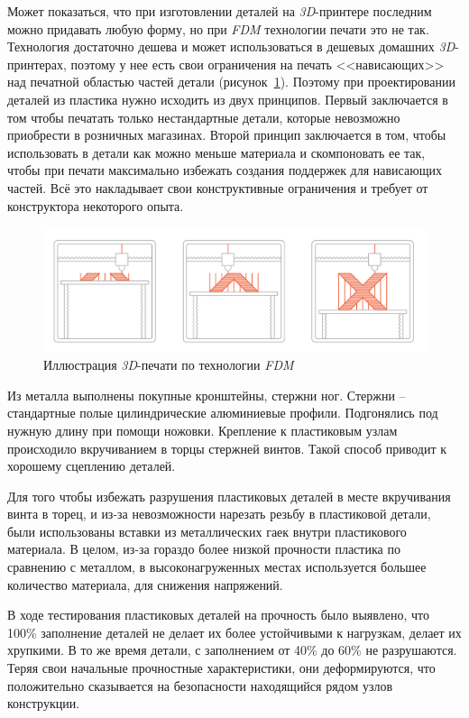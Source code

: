 Может показаться, что при изготовлении деталей на \textit{3D}-принтере последним можно придавать любую форму, но при \textit{FDM} технологии печати это не так. Технология достаточно дешева и может использоваться в дешевых домашних \textit{3D}-принтерах, поэтому у нее есть свои ограничения на печать <<нависающих>> над печатной областью частей детали (рисунок~\ref{fig:print_demo}). Поэтому при проектировании деталей из пластика нужно исходить из двух принципов. Первый заключается в том чтобы печатать только нестандартные детали, которые невозможно приобрести в розничных магазинах. Второй принцип заключается в том, чтобы использовать в детали как можно меньше материала и скомпоновать ее так, чтобы при печати максимально избежать создания поддержек для нависающих частей. Всё это накладывает свои конструктивные ограничения и требует от конструктора некоторого опыта.

\begin{figure}[h]
    \centering
    \includegraphics[scale=0.3]{chapter_mechanics_construction/figure1.png}
    \caption{Иллюстрация \textit{3D}-печати по технологии \textit{FDM}}
    \label{fig:print_demo}
\end{figure}

Из металла выполнены покупные кронштейны, стержни ног. Стержни -- стандартные полые цилиндрические алюминиевые профили. Подгонялись под нужную длину при помощи ножовки. Крепление к пластиковым узлам происходило вкручиванием в торцы стержней винтов. Такой способ приводит к хорошему сцеплению деталей.

Для того чтобы избежать разрушения пластиковых деталей в месте вкручивания винта в торец, и из-за невозможности нарезать резьбу в пластиковой детали, были использованы вставки из металлических гаек внутри пластикового материала. В целом, из-за гораздо более низкой прочности пластика по сравнению с металлом, в высоконагруженных местах используется большее количество материала, для снижения напряжений.

В ходе тестирования пластиковых деталей на прочность было выявлено, что 100\% заполнение деталей не делает их более устойчивыми к нагрузкам, делает их хрупкими. В то же время детали, с заполнением от 40\% до 60\% не разрушаются. Теряя свои начальные прочностные характеристики, они деформируются, что положительно сказывается на безопасности находящийся рядом узлов конструкции.

